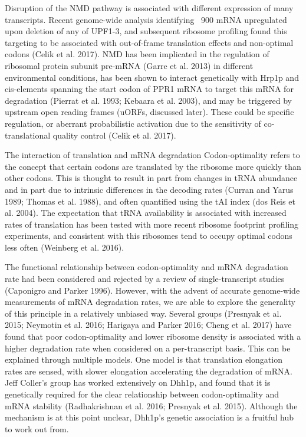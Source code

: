 Disruption of the NMD pathway is associated
with different expression of many transcripts. Recent genome-wide
analysis identifying ~900 mRNA upregulated upon deletion of any of
UPF1-3, and subsequent ribosome profiling found this targeting to be
associated with out-of-frame translation effects and non-optimal
codons (Celik et al. 2017). NMD has been implicated in the regulation
of ribosomal protein subunit pre-mRNA (Garre et al. 2013) in different
environmental conditions, has been shown to interact genetically with
Hrp1p and cis-elements spanning the start codon of PPR1 mRNA to target
this mRNA for degradation (Pierrat et al. 1993; Kebaara et al. 2003),
and may be triggered by upstream open reading frames (uORFs, discussed
later). These could be specific regulation, or aberrant probabilistic
activation due to the sensitivity of co-translational quality control
(Celik et al. 2017).  

The interaction of translation and mRNA
degradation Codon-optimality refers to the concept that certain codons
are translated by the ribosome more quickly than other codons. This is
thought to result in part from changes in tRNA abundance and in part
due to intrinsic differences in the decoding rates (Curran and Yarus
1989; Thomas et al. 1988), and often quantified using the tAI index
(dos Reis et al. 2004). The expectation that tRNA availability is
associated with increased rates of translation has been tested with
more recent ribosome footprint profiling experiments, and consistent
with this ribosomes tend to occupy optimal codons less often (Weinberg
et al. 2016).  

The functional relationship between codon-optimality
and mRNA degradation rate had been considered and rejected by a review
of single-transcript studies (Caponigro and Parker 1996). However,
with the advent of accurate genome-wide measurements of mRNA
degradation rates, we are able to explore the generality of this
principle in a relatively unbiased way. Several groups (Presnyak et
al. 2015; Neymotin et al. 2016; Harigaya and Parker 2016; Cheng et al.
2017) have found that poor codon-optimality and lower ribosome density
is associated with a higher degradation rate when considered on a
per-transcript basis. This can be explained through multiple models.
One model is that translation elongation rates are sensed, with slower
elongation accelerating the degradation of mRNA. Jeff Coller’s group
has worked extensively on Dhh1p, and found that it is genetically
required for the clear relationship between codon-optimality and mRNA
stability (Radhakrishnan et al. 2016; Presnyak et al. 2015). Although
the mechanism is at this point unclear, Dhh1p’s genetic association is
a fruitful hub to work out from.  

